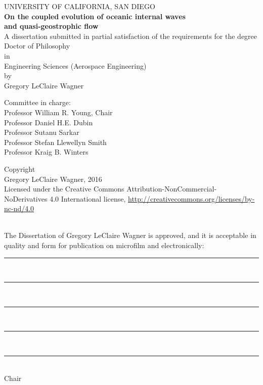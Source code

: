 \documentclass[12pt, oneside]{book}
\begin{document}
\pagestyle{title}

 
\setcounter{page}{1}

\begingroup  
  \centering
  UNIVERSITY OF CALIFORNIA, SAN DIEGO \\[12ex]
  \textbf{On the coupled evolution of oceanic internal waves \\ and quasi-geostrophic flow} \\[12ex]
  A dissertation submitted in partial satisfaction of the requirements for the degree \\
  Doctor of Philosophy \\[6ex]
  in \\[6ex]
  Engineering Sciences (Aerospace Engineering) \\[6ex]
  by \\[6ex]
  Gregory LeClaire Wagner \par
\endgroup

\vfill 
\begingroup
  \noindent
  Committee in charge: \\[2ex]
  \indent Professor William R. Young, Chair \\
  \indent Professor Daniel H.E. Dubin \\
  \indent Professor Sutanu Sarkar \\
  \indent Professor Stefan Llewellyn Smith \\
  \indent Professor Kraig B. Winters \\[6ex]
\endgroup

\begingroup
   \par
\endgroup


\clearpage
\thispagestyle{empty}
  
\hfill \vfill
\begingroup
  \centering
  Copyright \\ \bigskip
  Gregory LeClaire Wagner, 2016 \\ \bigskip
  Licensed under the Creative Commons Attribution-NonCommercial-NoDerivatives 4.0 International license, \url{http://creativecommons.org/licenses/by-nc-nd/4.0} \par
\endgroup


\clearpage
{} {}
\pagestyle{preliminary}
\doublespacing
\hfill \\[6ex]
\begingroup
\noindent The Dissertation of Gregory LeClaire Wagner is approved, and it is acceptable in quality and form for publication on microfilm and electronically: \\[10ex]
\rule{\textwidth}{1pt} \\[8ex]
\rule{\textwidth}{1pt} \\[8ex]
\rule{\textwidth}{1pt} \\[8ex]
\rule{\textwidth}{1pt} \\[8ex] 
\rule{\textwidth}{1pt} \\[-8ex] 
\flushright Chair \\[12ex]
\endgroup
\end{document}
